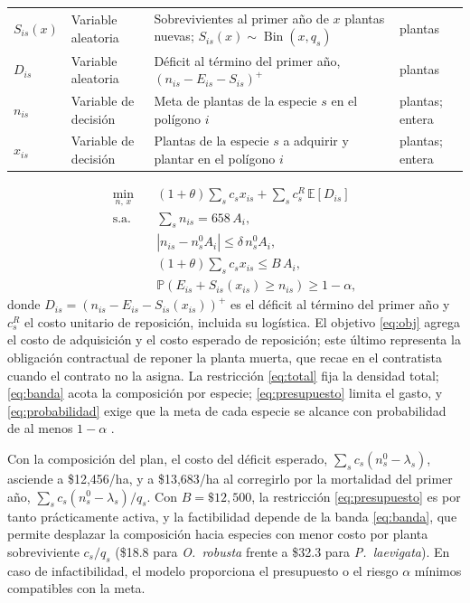 \begin{table}[t]
\begin{tabular}{@{}lp{}p{}p{}@{}}
$S_{is}(x)$ & Variable aleatoria & Sobrevivientes al primer año de $x$ plantas nuevas; $S_{is}(x)\sim\operatorname{Bin}(x,q_s)$ & plantas \\
$D_{is}$ & Variable aleatoria & Déficit al término del primer año, $\left(n_{is}-E_{is}-S_{is}\right)^{+}$ & plantas \\
$n_{is}$ & Variable de decisión & Meta de plantas de la especie $s$ en el polígono $i$ & plantas; entera \\
$x_{is}$ & Variable de decisión & Plantas de la especie $s$ a adquirir y plantar en el polígono $i$ & plantas; entera \\
\bottomrule
\end{tabular}
\end{table}

\begin{align}
\min_{n,\,x}\quad & (1+\theta)\sum_{s}c_sx_{is}+\sum_{s}c_s^{R}\,\mathbb{E}\!\left[D_{is}\right] \label{eq:obj}\\
\text{s.a.}\quad & \sum_{s}n_{is}=658\,A_i, \label{eq:total}\\
& \left|n_{is}-n_s^0A_i\right|\leq\delta\,n_s^0A_i, \label{eq:banda}\\
& (1+\theta)\sum_{s}c_sx_{is}\leq B\,A_i, \label{eq:presupuesto}\\
& \mathbb{P}\!\left(E_{is}+S_{is}(x_{is})\geq n_{is}\right)\geq1-\alpha, \label{eq:probabilidad}
\end{align}
donde $D_{is}=\left(n_{is}-E_{is}-S_{is}(x_{is})\right)^{+}$ es el déficit al término del primer año y $c_s^{R}$ el costo unitario de reposición, incluida su logística. El objetivo \eqref{eq:obj} agrega el costo de adquisición y el costo esperado de reposición; este último representa la obligación contractual de reponer la planta muerta, que recae en el contratista cuando el contrato no la asigna. La restricción \eqref{eq:total} fija la densidad total; \eqref{eq:banda} acota la composición por especie; \eqref{eq:presupuesto} limita el gasto, y \eqref{eq:probabilidad} exige que la meta de cada especie se alcance con probabilidad de al menos $1-\alpha$ \autocite{charnes1959}.

Con la composición del plan, el costo del déficit esperado, $\sum_sc_s(n_s^0-\lambda_s)$, asciende a \$12{,}456/ha, y a \$13{,}683/ha al corregirlo por la mortalidad del primer año, $\sum_sc_s(n_s^0-\lambda_s)/q_s$. Con $B=\$12{,}500$, la restricción \eqref{eq:presupuesto} es por tanto prácticamente activa, y la factibilidad depende de la banda \eqref{eq:banda}, que permite desplazar la composición hacia especies con menor costo por planta sobreviviente $c_s/q_s$ (\$18.8 para \textit{O.~robusta} frente a \$32.3 para \textit{P.~laevigata}). En caso de infactibilidad, el modelo proporciona el presupuesto o el riesgo $\alpha$ mínimos compatibles con la meta.

